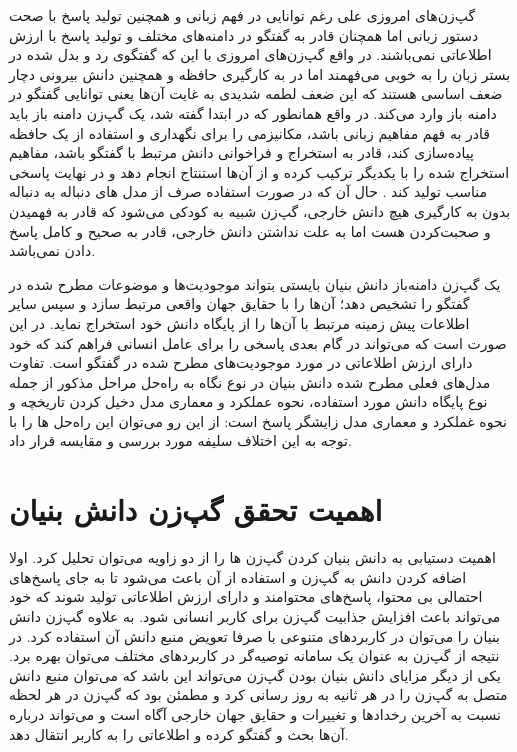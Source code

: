 گپ‌زن‌های امروزی علی رغم توانایی در فهم زبانی و همچنین تولید پاسخ با صحت دستور زبانی اما همچنان قادر به 
گفتگو در دامنه‌های مختلف و تولید پاسخ با ارزش اطلاعاتی نمی‌باشند. در واقع گپ‌زن‌های امروزی با این که گفتگوی رد و بدل شده در بستر زبان را به خوبی می‌فهمند اما در به کارگیری حافظه و همچنین دانش بیرونی دچار ضعف اساسی هستند که این ضعف لطمه شدیدی به غایت آن‌ها یعنی توانایی گفتگو در دامنه باز وارد می‌کند. در واقع همانطور که در ابتدا گفته شد، یک گپ‌زن دامنه باز باید قادر به فهم مفاهیم زبانی باشد، مکانیزمی را برای نگهداری و استفاده از یک حافظه پیاده‌سازی کند، قادر به استخراج و فراخوانی دانش مرتبط با گفتگو باشد، مفاهیم استخراج‌ شده را با یکدیگر ترکیب کرده و از آن‌ها استنتاج انجام دهد و در نهایت پاسخی مناسب تولید کند
\cite{wizard}
.
حال آن که در صورت استفاده صرف از مدل های دنباله به دنباله بدون به کارگیری هیچ دانش خارجی، گپ‌زن شبیه به کودکی می‌شود که قادر به فهمیدن و صحبت‌کردن هست اما به علت نداشتن دانش خارجی، قادر به صحیح و کامل پاسخ دادن نمی‌باشد.

یک گپ‌زن دامنه‌باز دانش بنیان بایستی بتواند موجودیت‌ها و موضوعات مطرح شده در گفتگو را تشخیص دهد؛ آن‌ها را با حقایق جهان واقعی مرتبط سازد و سپس سایر اطلاعات 
پیش زمینه مرتبط با آن‌ها را از پایگاه دانش خود استخراج نماید. 
در این صورت است که می‌تواند در گام بعدی پاسخی را برای عامل انسانی فراهم کند که خود دارای ارزش اطلاعاتی در مورد موجودیت‌های مطرح شده در گفتگو است. 
تفاوت مدل‌های فعلی مطرح شده دانش بنیان در نوع نگاه به راه‌حل مراحل مذکور 
از جمله نوع پایگاه دانش مورد استفاده، نحوه عملکرد و معماری مدل دخیل کردن تاریخچه و نحوه غملکرد و معماری مدل زایشگر پاسخ
است: از این رو می‌توان این راه‌حل ها را با توجه به این اختلاف سلیفه مورد بررسی و مقایسه قرار داد. 

\section{اهمیت تحقق گپ‌زن دانش بنیان} \label{chap1:knowledge_importance}

اهمیت دستیابی به دانش بنیان کردن گپ‌زن ها را از دو زاویه می‌توان تحلیل کرد. اولا اضافه کردن دانش به گپ‌زن و استفاده از آن باعث می‌شود تا به جای پاسخ‌های احتمالی بی محتوا، پاسخ‌های محتوامند و دارای ارزش اطلاعاتی تولید شوند که خود می‌تواند باعث افزایش جذابیت گپ‌زن برای کاربر انسانی شود. به علاوه گپ‌زن دانش بنیان را می‌توان در کاربردهای متنوعی با صرفا تعویض منبع دانش آن استفاده کرد. در نتیجه از گپ‌زن به عنوان یک سامانه توصیه‌گر در کاربردهای مختلف 
می‌توان بهره برد. یکی از دیگر مزایای دانش بنیان بودن گپ‌زن می‌تواند این باشد که می‌توان منبع دانش متصل به گپ‌زن را در هر ثانیه به روز رسانی کرد و مطمئن بود که گپ‌زن در هر لحظه نسبت به آخرین رخدادها و تغییرات و حقایق جهان خارجی آگاه است و می‌تواند درباره آن‌ها بحث و گفتگو کرده و اطلاعاتی را به کاربر انتقال دهد.

